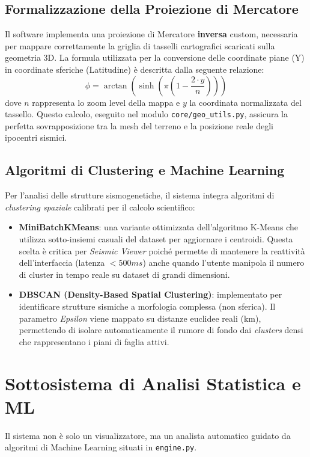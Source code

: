 \documentclass[12pt,a4paper]{article}
\begin{document}
\subsection{Formalizzazione della Proiezione di Mercatore}
Il software implementa una proiezione di Mercatore \textbf{inversa} custom, necessaria per mappare correttamente la griglia di tasselli cartografici scaricati sulla geometria 3D. La formula utilizzata per la conversione delle coordinate piane (Y) in coordinate sferiche (Latitudine) è descritta dalla seguente relazione:
\[
\phi = \arctan\left(\sinh\left(\pi \left(1 - \frac{2 \cdot y}{n}\right)\right)\right)
\]
dove $n$ rappresenta lo zoom level della mappa e $y$ la coordinata normalizzata del tassello. Questo calcolo, eseguito nel modulo \texttt{core/geo\_utils.py}, assicura la perfetta sovrapposizione tra la mesh del terreno e la posizione reale degli ipocentri sismici.

\subsection{Algoritmi di Clustering e Machine Learning}
Per l'analisi delle strutture sismogenetiche, il sistema integra algoritmi di \textit{clustering spaziale} calibrati per il calcolo scientifico:
\begin{itemize}
    \item \textbf{MiniBatchKMeans}: una variante ottimizzata dell'algoritmo K-Means che utilizza sotto-insiemi casuali del dataset per aggiornare i centroidi. Questa scelta è critica per \textit{Seismic Viewer} poiché permette di mantenere la reattività dell'interfaccia (latenza $<500ms$) anche quando l'utente manipola il numero di cluster in tempo reale su dataset di grandi dimensioni.
    \item \textbf{DBSCAN (Density-Based Spatial Clustering)}: implementato per identificare strutture sismiche a morfologia complessa (non sferica). Il parametro \textit{Epsilon} viene mappato su distanze euclidee reali (km), permettendo di isolare automaticamente il rumore di fondo dai \textit{clusters} densi che rappresentano i piani di faglia attivi.
\end{itemize}

\section{Sottosistema di Analisi Statistica e ML}
Il sistema non è solo un visualizzatore, ma un analista automatico guidato da algoritmi di Machine Learning situati in \texttt{engine.py}.
\end{document}
